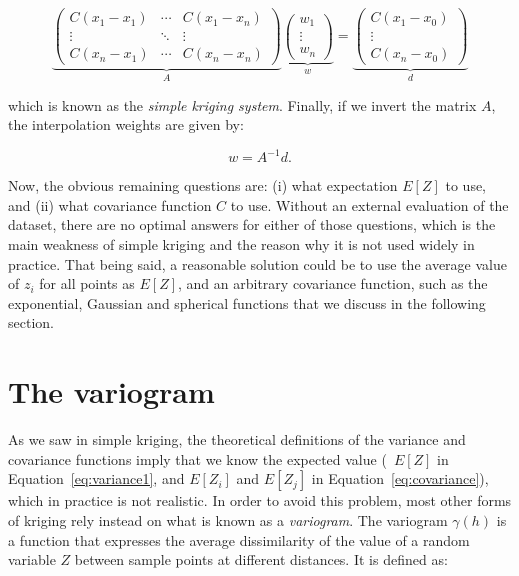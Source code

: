 \begin{equation}
%
\underbrace{\left( \begin{array}{ccc}
C(x_1-x_1) & \cdots & C(x_1-x_n) \\
\vdots & \ddots & \vdots \\
C(x_n-x_1) & \cdots & C(x_n-x_n) \end{array} \right)}_{A}
%
\underbrace{\left(\begin{array}{c}
w_1 \\
\vdots \\
w_n \end{array} \right)}_{w} = 
%
\underbrace{\left(\begin{array}{c}
C(x_1-x_0) \\
\vdots \\
C(x_n-x_0) \end{array} \right)}_{d}
\end{equation}

which is known as the \emph{simple kriging system}.
Finally, if we invert the matrix \(A\), the interpolation weights are given by:

\begin{equation}
w = A^{-1}d.
\end{equation}

Now, the obvious remaining questions are: (i) what expectation \(E[Z]\) to use, and (ii) what covariance function \(C\) to use.
Without an external evaluation of the dataset, there are no optimal answers for either of those questions, which is the main weakness of simple kriging and the reason why it is not used widely in practice.
That being said, a reasonable solution could be to use the average value of \(z_i\) for all points as \(E[Z]\), and an arbitrary covariance function, such as the exponential, Gaussian and spherical functions that we discuss in the following section.

\section{The variogram}%

As we saw in simple kriging, the theoretical definitions of the variance and covariance functions imply that we know the expected value (\ie\ \(E[Z]\) in Equation~\ref{eq:variance1}, and \(E[Z_i]\) and \(E[Z_j]\) in Equation~\ref{eq:covariance}), which in practice is not realistic.
In order to avoid this problem, most other forms of kriging rely instead on what is known as a \emph{variogram}.
The variogram \(\gamma(h)\) is a function that expresses the average dissimilarity of the value of a random variable \(Z\) between sample points at different distances.
It is defined as:


